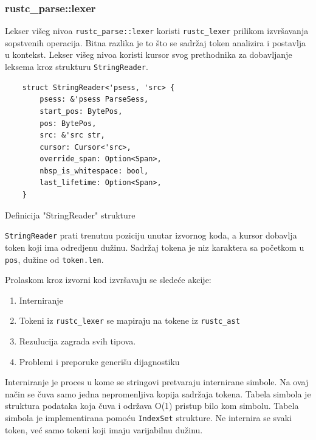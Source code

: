 \documentclass[11pt]{article}
\begin{document}
\newpage
\subsubsection{rustc\_parse::lexer}

Lekser višeg nivoa \verb|rustc_parse::lexer| koristi \verb|rustc_lexer| prilikom izvršavanja sopstvenih
operacija. Bitna razlika je to što se sadržaj token analizira i postavlja u kontekst.
Lekser višeg nivoa koristi kursor svog prethodnika za dobavljanje leksema kroz strukturu \verb|StringReader|. 

\begin{listing}[H]
\begin{verbatim}
    struct StringReader<'psess, 'src> {
        psess: &'psess ParseSess,
        start_pos: BytePos,
        pos: BytePos,
        src: &'src str,
        cursor: Cursor<'src>,
        override_span: Option<Span>,
        nbsp_is_whitespace: bool,
        last_lifetime: Option<Span>,
    }
\end{verbatim}
\caption{Definicija "StringReader" strukture}
\end{listing}
\verb|StringReader| prati trenutnu poziciju unutar izvornog koda, a kursor 
dobavlja token koji ima odredjenu dužinu. Sadržaj tokena je niz karaktera sa početkom u \verb|pos|,
dužine od \verb|token.len|. 

Prolaskom kroz izvorni kod izvršavaju se sledeće akcije:
\begin{enumerate}
    \item Interniranje 
    \item Tokeni iz \verb|rustc_lexer| se mapiraju na tokene iz \verb|rustc_ast|
    \item Rezulucija zagrada svih tipova.
    \item Problemi i preporuke generišu dijagnostiku 
\end{enumerate}

Interniranje je proces u kome se stringovi pretvaraju internirane simbole. Na ovaj način
se čuva samo jedna nepromenljiva kopija sadržaja tokena. Tabela simbola je struktura podataka
koja čuva i održava O(1) pristup bilo kom simbolu.  Tabela simbola je implementirana pomoću \verb|IndexSet|
strukture. Ne internira se svaki token, već samo tokeni koji imaju varijabilnu dužinu.
\end{document}
